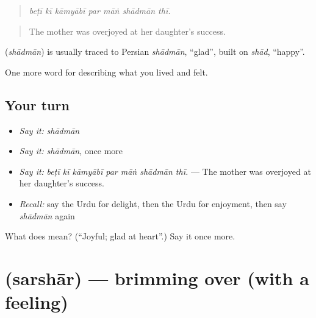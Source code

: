 \begin{quote}
      
\end{quote}

\begin{quote}
\emph{beṭī kī kāmyābī par māṅ shādmān thī.}
\end{quote}

\begin{quote}
The mother was overjoyed at her daughter's success.
\end{quote}

\begin{cousinweb}
\textbf{} (\emph{shādmān}) is usually traced to Persian \emph{shādmān}, \textquotedblleft{}glad\textquotedblright{}, built on \emph{shād}, \textquotedblleft{}happy\textquotedblright{}.
\end{cousinweb}

\begin{grammarlens}[title={What you've built}]
One more word for describing what you lived and felt.
\end{grammarlens}

\subsection*{Your turn}
\begin{itemize}
\raggedright
  \item \emph{Say it:} \emph{shādmān}
  \item \emph{Say it:} \emph{shādmān}, once more
  \item \emph{Say it:} \emph{beṭī kī kāmyābī par māṅ shādmān thī.} — The mother was overjoyed at her daughter's success.
  \item \emph{Recall:} say the Urdu for delight, then the Urdu for enjoyment, then say \emph{shādmān} again
\end{itemize}

\begin{tcolorbox}[breakable,colback=teal!4,colframe=teal!35!black,title={Before you move on}]
What does  mean? (\textquotedblleft{}Joyful; glad at heart\textquotedblright{}.) Say it once more.
\end{tcolorbox}
\section[\texorpdfstring{\ur{سرشار} (sarshār)}{سرشار (sarshār)}]{ (sarshār) — brimming over (with a feeling)}

